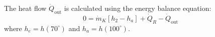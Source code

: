 The heat flow \( \dot{Q}_{\text{out}} \) is calculated using the energy balance equation:  
\[
0 = \dot{m}_K \left[ h_2 - h_a \right] + \dot{Q}_R - \dot{Q}_{\text{out}}
\]  
where \( h_e = h(70^\circ) \) and \( h_a = h(100^\circ) \).